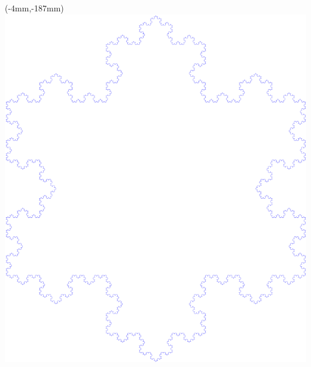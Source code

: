 \documentclass[11pt,letterpaper]{exam}
\begin{document}
\begin{textblock*}{100mm}(-4mm,-187mm)
  \includegraphics[width=21cm]{koch6_tight.pdf}
\end{textblock*}

\vspace{0.5cm}
\end{document}
